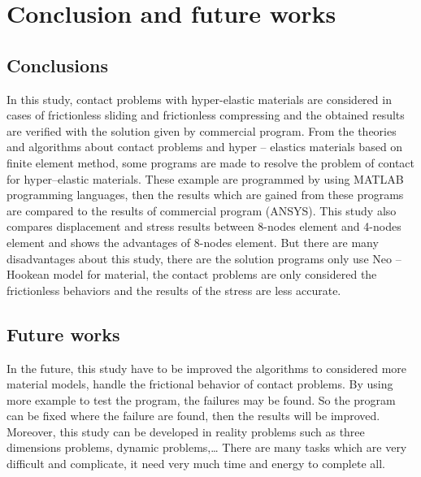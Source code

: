 \chapter{Conclusion and future works} %

\label{Chapter5 } %
\section{Conclusions}
In this study, contact problems with hyper-elastic materials are considered in cases of frictionless sliding and frictionless compressing and the obtained results are verified with the solution given by commercial program. From the theories and algorithms about contact problems and hyper – elastics materials based on finite element method, some programs are made to resolve the problem of contact for hyper–elastic materials. These example are programmed by using MATLAB programming languages, then the results which are gained from these programs are compared to the results of commercial program (ANSYS).
This study also compares displacement and stress results between 8-nodes element and 4-nodes element and shows the advantages of 8-nodes element.
\vspace{0.38cm}
\newline
But there are many disadvantages about this study, there are the solution programs only use Neo – Hookean model for material, the contact problems are only considered the frictionless behaviors and the results of the stress are less accurate.
\section{Future works}
In the future, this study have to be improved the algorithms to considered more material models, handle the frictional behavior of contact problems. By using more example to test the program, the failures may be found. So the program can be fixed where the failure are found, then the results will be improved.
\vspace{0.38cm}
\newline
Moreover, this study can be developed in reality problems such as three dimensions problems, dynamic problems,… There are many tasks which are very difficult and complicate, it need very much time and energy to complete all.